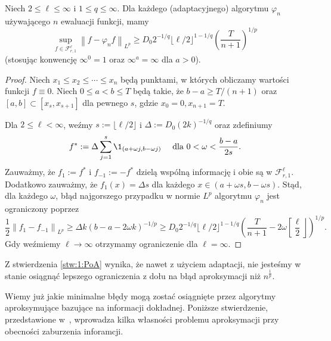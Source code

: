 \documentclass[oik, pdftex, robocza, man]{mgrwms}
\begin{document}
    \begin{stw} \label{stw:1:PoA}
        Niech $2 \leq \ell \leq \infty$ i $1 \leq q \leq \infty$. Dla każdego (adaptacyjnego) algorytmu $\varphi_{n}$ używającego $n$ ewaluacji funkcji, mamy
        \begin{equation*}
            \sup _{f \in \mathcal{F}_{r, 1}^{\ell}}\left\|f-\varphi_{n} f\right\|_{L^{p}} \geq D_{0} 2^{-1 / q}\lfloor\ell / 2\rfloor^{1-1 / q}\left(\frac{T}{n+1}\right)^{1 / p}    
        \end{equation*}
        (stosując konwencję $\infty^{0}=1$ oraz $\infty^{a}=\infty$ dla $a>0$).
    \end{stw}
    \begin{proof}
        Niech $x_{1} \leq x_{2} \leq \cdots \leq x_{n}$ będą punktami, w których obliczamy wartości funkcji $f \equiv 0$. Niech $0 \leq a<b \leq T$ będą takie, że $b-a \geq T /(n+1)$ oraz $[a, b] \subset\left[x_{s}, x_{s+1}\right]$ dla pewnego $s$, gdzie $x_{0}=0, x_{n+1}=T$.

        Dla $2 \leq \ell<\infty$, weźmy $s:=\lfloor\ell / 2\rfloor$ i $\Delta:=D_{0}(2 k)^{-1 / q}$ oraz zdefiniumy
        \begin{equation*}
            f^{*}:=\Delta \sum_{j=1}^{s} \1_{(a+\omega j, b-\omega j)} \quad \text{ dla } 0<\omega<\frac{b-a}{2 s}.
        \end{equation*}
        Zauważmy, że $f_{1}:=f^{*}$ i $f_{-1}:=-f^{*}$ dzielą wspólną informację i obie są w $\mathcal{F}_{r, 1}^{\ell}$. Dodatkowo zauważmy, że  $f_{1}(x)=\Delta s$ dla każdego $x \in(a+\omega s, b-\omega s)$. Stąd, dla każdego $\omega$, błąd najgorszego przypadku w normie $L^{p}$ algorytmu $\varphi_{n}$ jest ograniczony poprzez
        \begin{equation*}
            \frac{1}{2}\left\|f_{1}-f_{-1}\right\|_{L^{p}} \geq \Delta k(b-a-2 \omega k)^{-1 / p} \geq D_{0} 2^{-1 / q}\lfloor\ell / 2\rfloor^{1-1 / q}\left(\frac{T}{n+1}-2 \omega\left[\frac{\ell}{2}\right\rfloor\right)^{1 / p}.
        \end{equation*}
        Gdy weźmiemy $\ell \rightarrow \infty$ otrzymamy ograniczenie dla $\ell = \infty$.
    \end{proof}

    Z stwierdzenia \ref{stw:1:PoA} wynika, że nawet z użyciem adaptacji, nie jesteśmy w stanie osiągnąć lepszego ograniczenia z dołu na błąd aproksymacji niż $n^{\frac{1}{p}}$.

    Wiemy już jakie minimalne błędy mogą zostać osiągnięte przez algorytmy aproksymujące bazujące na informacji dokładnej. Poniższe stwierdzenie, przedstawione w~\cite{AoP}, wprowadza kilka własności problemu aproksymacji przy obecności zaburzenia inforamcji.
\end{document}
